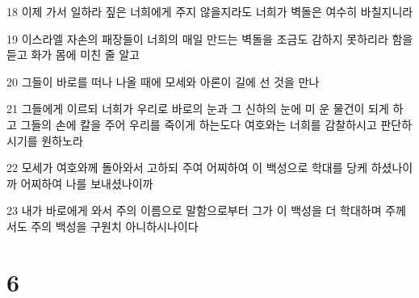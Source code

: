 \par 18 이제 가서 일하라 짚은 너희에게 주지 않을지라도 너희가 벽돌은 여수히 바칠지니라
\par 19 이스라엘 자손의 패장들이 너희의 매일 만드는 벽돌을 조금도 감하지 못하리라 함을 듣고 화가 몸에 미친 줄 알고
\par 20 그들이 바로를 떠나 나올 때에 모세와 아론이 길에 선 것을 만나
\par 21 그들에게 이르되 너희가 우리로 바로의 눈과 그 신하의 눈에 미 운 물건이 되게 하고 그들의 손에 칼을 주어 우리를 죽이게 하는도다 여호와는 너희를 감찰하시고 판단하시기를 원하노라
\par 22 모세가 여호와께 돌아와서 고하되 주여 어찌하여 이 백성으로 학대를 당케 하셨나이까 어찌하여 나를 보내셨나이까
\par 23 내가 바로에게 와서 주의 이름으로 말함으로부터 그가 이 백성을 더 학대하며 주께서도 주의 백성을 구원치 아니하시나이다

\chapter{6}

